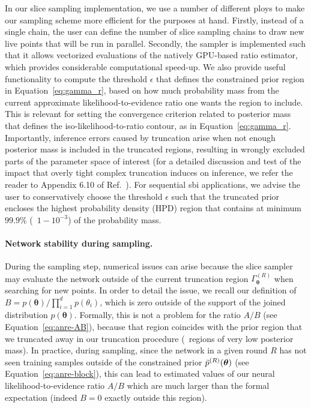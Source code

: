 In our slice sampling implementation, we use a number of different ploys to make our sampling scheme more efficient for the purposes at hand. Firstly, instead of a single chain, the user can define the number of slice sampling chains to draw new live points that will be run in parallel. Secondly, the sampler is implemented such that it allows vectorized evaluations of the natively GPU-based ratio estimator, which provides considerable computational speed-up. We also provide useful functionality to compute the threshold $\epsilon$ that defines the constrained prior region in Equation~\eqref{eq:gamma_r}, based on how much probability mass from the current approximate likelihood-to-evidence ratio one wants the region to include. This is relevant for setting the convergence criterion related to posterior mass that defines the iso-likelihood-to-ratio contour, as in Equation~\eqref{eq:gamma_r}. Importantly, inference errors caused by truncation arise when not enough posterior mass is included in the truncated regions, resulting in wrongly excluded parts of the parameter space of interest (for a detailed discussion and test of the impact that overly tight complex truncation induces on inference, we refer the reader to Appendix 6.10 of Ref.~\cite{Deistler:2022aa}). 
For sequential \gls*{sbi} applications, we advise the user to conservatively choose the threshold $\epsilon$ such that the truncated prior encloses the highest probability density (HPD) region that contains at minimum $99.9 \%$ (\ie~$1 - 10^{-3}$) of the probability mass. 

\paragraph*{Network stability during sampling.}
During the sampling step, numerical issues can arise because the slice sampler may evaluate the network outside of the current truncation region $\Gamma^{(R)}_{\boldsymbol{\theta}}$ when searching for new points.
In order to detail the issue, we recall our definition of $B={p(\boldsymbol \theta)}/{\prod_{i=1}^d p(\theta_i)}$, which is zero outside of the support of the joined distribution $p(\boldsymbol \theta)$. Formally, this is not a problem for the ratio $A/B$ (see Equation~\eqref{eq:anre-AB}), because that region coincides with the prior region that we truncated away in our truncation procedure (\ie~regions of very low posterior mass). In practice, during sampling, since the network in a given round $R$ has not seen training samples outside of the constrained prior $\tilde p^{(R)}(\bm{\theta})$ (see Equation~\eqref{eq:anre-block}), this can lead to estimated values of our neural likelihood-to-evidence ratio $A/B$ which are much larger than the formal expectation (indeed $B = 0$ exactly outside this region).

